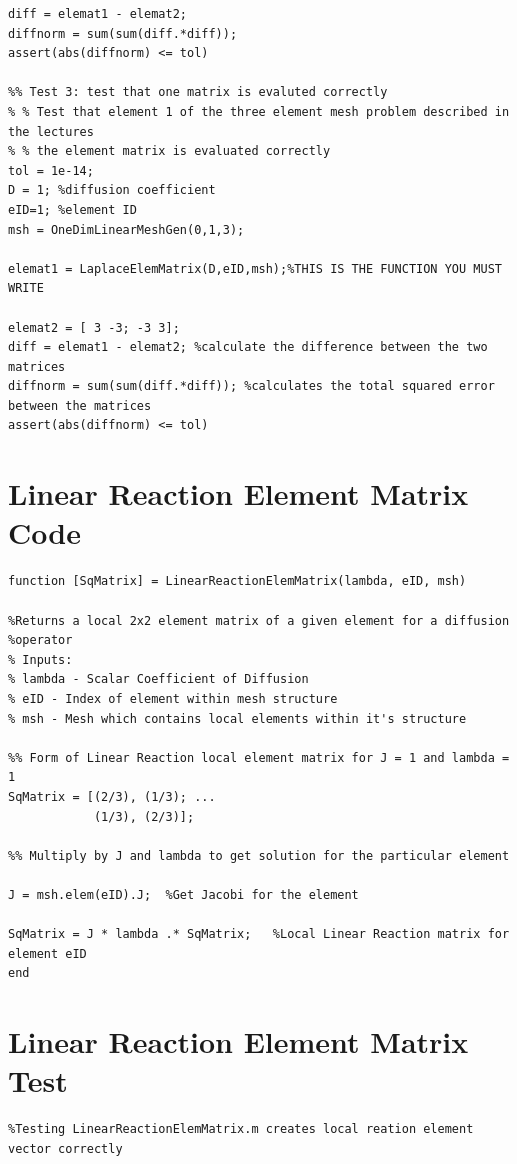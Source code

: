 \documentclass[11pt]{article}
\begin{document}
\begin{appendices}
\begin{lstlisting}
diff = elemat1 - elemat2;
diffnorm = sum(sum(diff.*diff));
assert(abs(diffnorm) <= tol)

%% Test 3: test that one matrix is evaluted correctly
% % Test that element 1 of the three element mesh problem described in the lectures
% % the element matrix is evaluated correctly
tol = 1e-14;
D = 1; %diffusion coefficient
eID=1; %element ID
msh = OneDimLinearMeshGen(0,1,3);

elemat1 = LaplaceElemMatrix(D,eID,msh);%THIS IS THE FUNCTION YOU MUST WRITE

elemat2 = [ 3 -3; -3 3];
diff = elemat1 - elemat2; %calculate the difference between the two matrices
diffnorm = sum(sum(diff.*diff)); %calculates the total squared error between the matrices
assert(abs(diffnorm) <= tol)
\end{lstlisting}
\pagebreak


\section{Linear Reaction Element Matrix Code} \label{ap:React}
\begin{lstlisting}
function [SqMatrix] = LinearReactionElemMatrix(lambda, eID, msh)

%Returns a local 2x2 element matrix of a given element for a diffusion
%operator
% Inputs: 
% lambda - Scalar Coefficient of Diffusion
% eID - Index of element within mesh structure
% msh - Mesh which contains local elements within it's structure

%% Form of Linear Reaction local element matrix for J = 1 and lambda = 1
SqMatrix = [(2/3), (1/3); ...
            (1/3), (2/3)];

%% Multiply by J and lambda to get solution for the particular element

J = msh.elem(eID).J;  %Get Jacobi for the element

SqMatrix = J * lambda .* SqMatrix;   %Local Linear Reaction matrix for element eID
end

\end{lstlisting}

\pagebreak

\section{Linear Reaction Element Matrix Test} \label{ap:ReactTest}
\begin{lstlisting}
%Testing LinearReactionElemMatrix.m creates local reation element vector correctly


\end{lstlisting}
\end{appendices}
\end{document}
